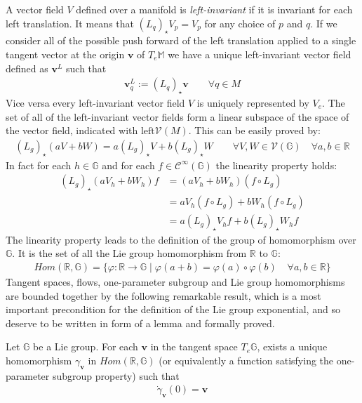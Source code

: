 A vector field $V$ defined over a manifold is \emph{left-invariant} if it is invariant for each left translation. It means that $(L_{q})_{\star} V_{p} = V_{p}$ for any choice of $p$ and $q$. If we consider all of the possible push forward of the left translation applied to a single tangent vector at the origin $\mathbf{v}$ of $T_{e}\mathbb{M}$ we have a unique left-invariant vector field defined as $\mathbf{v}^{L}$ such that
\begin{align*}
\mathbf{v}^{L}_{q} := (L_{q})_{\star} \mathbf{v} \qquad \forall q \in M
\end{align*}
Vice versa every left-invariant vector field $V$ is uniquely represented by $V_{e}$.
 The set of all of the left-invariant vector fields form a linear subspace of the space of the vector field, indicated with $\text{left}\mathcal{V}(M)$. This can be easily proved by:
\begin{align*}
(L_{g})_{\star} (aV +bW) = a (L_{g})_{\star} V + b (L_{g})_{\star} W
\qquad 
\forall V, W \in \mathcal{V}(\mathbb{G}) 
\quad 
\forall a, b \in \mathbb{R}
\end{align*}
In fact for each $h \in \mathbb{G}$ and for each $f \in \mathcal{C}^{\infty}(\mathbb{G})$ the linearity property holds:
\begin{align*}
(L_{g})_{\star} (aV_{h} +bW_{h})f &= (aV_{h} +bW_{h})(f\circ L_{g} ) \\
&= aV_{h}(f\circ L_{g} ) +bW_{h}(f\circ L_{g} ) \\
&= a (L_{g})_{\star} V_{h}f + b (L_{g})_{\star} W_{h}f  
\end{align*}
The linearity property leads to the definition of the group of homomorphism over $\mathbb{G}$. It is the set of all the Lie group homomorphism from $\mathbb{R}$ to $\mathbb{G}$:
\begin{align*}
Hom(\mathbb{R},\mathbb{G}) = \lbrace \varphi: \mathbb{R} \rightarrow \mathbb{G} \mid \varphi(a+b) = \varphi(a) \circ \varphi(b)\phantom{aa} \forall a,b \in \mathbb{R} \rbrace
\end{align*}
Tangent spaces, flows, one-parameter subgroup and Lie group homomorphisms are bounded together by the following remarkable result, which is a most important precondition for the definition of the Lie group exponential, and so deserve to be written in form of a lemma and formally proved. 
\begin{lemma}
	Let $\mathbb{G}$ be a Lie group. For each $\mathbf{v}$ in the tangent space $T_{e}\mathbb{G}$, exists a unique homomorphism $\gamma_{\mathbf{v}}$ in $Hom(\mathbb{R},\mathbb{G})$ (or equivalently a function satisfying the one-parameter subgroup property) such that 
	\begin{align*}
	\dot{\gamma}_{\mathbf{v}}(0) = \mathbf{v}
	\end{align*}
\end{lemma}
